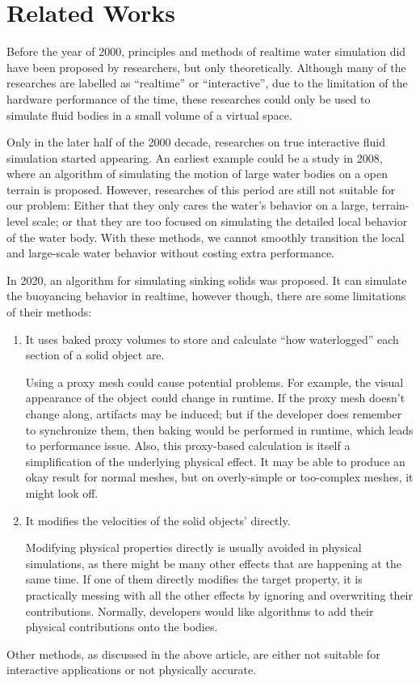 \section{Related Works}
Before the year of 2000, principles and methods of realtime water simulation did have been proposed by researchers\cite{CHE97}, but only theoretically.
Although many of the researches are labelled as ``realtime'' or ``interactive'', due to the limitation of the hardware performance of the time, these researches could only be used to simulate fluid bodies in a small volume of a virtual space.

Only in the later half of the 2000 decade, researches on true interactive fluid simulation started appearing.
An earliest example could be a study in 2008\cite{JUD08}, where an algorithm of simulating the motion of large water bodies on a open terrain is proposed.
However, researches of this period are still not suitable for our problem:
Either that they only cares the water's behavior on a large, terrain-level scale;
or that they are too focused on simulating the detailed local behavior of the water body.
With these methods, we cannot smoothly transition the local and large-scale water behavior without costing extra performance.

In 2020, an algorithm for simulating sinking solids was proposed\cite{RBM20}.
It can simulate the buoyancing behavior in realtime, however though, there are some limitations of their methods:
\begin{enumerate}
	\item It uses baked proxy volumes to store and calculate ``how waterlogged'' each section of a solid object are.

		Using a proxy mesh could cause potential problems.
		For example, the visual appearance of the object could change in runtime.
		If the proxy mesh doesn't change along, artifacts may be induced;
		but if the developer does remember to synchronize them, then baking would be performed in runtime, which leads to performance issue.
		Also, this proxy-based calculation is itself a simplification of the underlying physical effect.
		It may be able to produce an okay result for normal meshes, but on overly-simple or too-complex meshes, it might look off.

	\item It modifies the velocities of the solid objects' directly.

		Modifying physical properties directly is usually avoided in physical simulations, as there might be many other effects that are happening at the same time.
		If one of them directly modifies the target property, it is practically messing with all the other effects by ignoring and overwriting their contributions.
		Normally, developers would like algorithms to add their physical contributions onto the bodies.

\end{enumerate}
Other methods, as discussed in the above article, are either not suitable for interactive applications or not physically accurate.